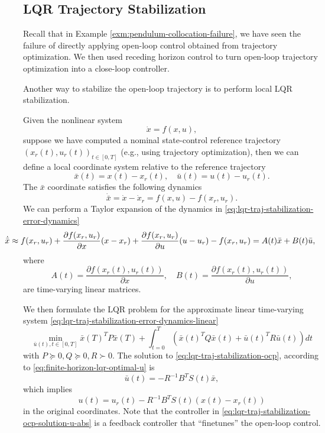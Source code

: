 \documentclass[
]{book}
\theoremstyle{definition}
\theoremstyle{definition}
\theoremstyle{definition}
\theoremstyle{definition}
\theoremstyle{remark}
\begin{document}
\hypertarget{lqr-trajectory-stabilization}{%
\subsection{LQR Trajectory Stabilization}\label{lqr-trajectory-stabilization}}

Recall that in Example \ref{exm:pendulum-collocation-failure}, we have seen the failure of directly applying open-loop control obtained from trajectory optimization. We then used receding horizon control to turn open-loop trajectory optimization into a close-loop controller.

Another way to stabilize the open-loop trajectory is to perform local LQR stabilization.

Given the nonlinear system
\[
\dot{x} = f(x,u),
\]
suppose we have computed a nominal state-control reference trajectory \((x_r(t),u_r(t))_{t \in [0,T]}\) (e.g., using trajectory optimization), then we can define a local coordinate system relative to the reference trajectory
\[
\bar{x}(t) = x(t) - x_r(t), \quad \bar{u}(t) = u(t) - u_r(t).
\]
The \(\bar{x}\) coordinate satisfies the following dynamics
\begin{equation}
\dot{\bar{x}} = \dot{x} - \dot{x}_r = f(x,u) - f(x_r, u_r).
\label{eq:lqr-traj-stabilization-error-dynamics}
\end{equation}
We can perform a Taylor expansion of the dynamics in \eqref{eq:lqr-traj-stabilization-error-dynamics}
\begin{equation}
\hspace{-10mm} \dot{\bar{x}} \approx f(x_r, u_r) + \frac{\partial f(x_r,u_r)}{\partial x} (x - x_r) + \frac{\partial f(x_r,u_r)}{\partial u} (u - u_r) - f(x_r, u_r) = A(t) \bar{x} + B(t) \bar{u},
\label{eq:lqr-traj-stabilization-error-dynamics-linear}
\end{equation}
where
\[
A(t) = \frac{\partial f(x_r(t),u_r(t))}{\partial x}, \quad B(t) = \frac{\partial f(x_r(t),u_r(t))}{\partial u},
\]
are time-varying linear matrices.

We then formulate the LQR problem for the approximate linear time-varying system \eqref{eq:lqr-traj-stabilization-error-dynamics-linear}
\begin{equation}
\min_{\bar{u}(t), t \in [0,T]} \bar{x}(T)^T P \bar{x}(T) + \int_{t=0}^T \left( \bar{x}(t)^T Q \bar{x}(t) + \bar{u}(t)^T R \bar{u}(t)  \right) dt
\label{eq:lqr-traj-stabilization-ocp}
\end{equation}
with \(P \succeq 0, Q \succeq 0, R \succ 0\). The solution to \eqref{eq:lqr-traj-stabilization-ocp}, according to \eqref{eq:finite-horizon-lqr-optimal-u} is
\[
\bar{u}(t) = - R^{-1} B^T S(t) \bar{x},
\]
which implies
\begin{equation}
u(t) = u_r(t) - R^{-1} B^T S(t) (x(t) - x_r(t))
\label{eq:lqr-traj-stabilization-ocp-solution-u-abs}
\end{equation}
in the original coordinates. Note that the controller in \eqref{eq:lqr-traj-stabilization-ocp-solution-u-abs} is a feedback controller that ``finetunes'' the open-loop control.
\end{document}
